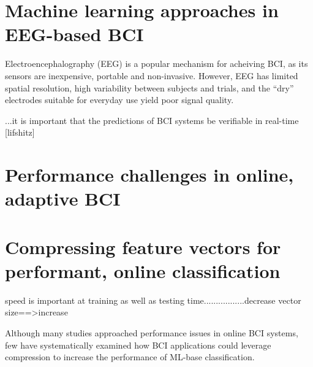 
\section{Machine learning approaches in EEG-based BCI}
Electroencephalography (EEG) is a popular mechanism for acheiving BCI, as its sensors are inexpensive, portable and non-invasive. However, EEG has limited spatial resolution, high variability between subjects and trials, and the ``dry'' electrodes suitable for everyday use yield poor signal quality. 

...it is important that the predictions of BCI systems be verifiable in real-time [lifshitz]

\section{Performance challenges in online, adaptive BCI}

\section{Compressing feature vectors for performant, online classification}
speed is important at training as well as testing time.................decrease vector size==>increase

Although many studies approached performance issues in online BCI systems,  few have systematically examined how BCI applications could leverage compression to increase the performance of ML-base classification.